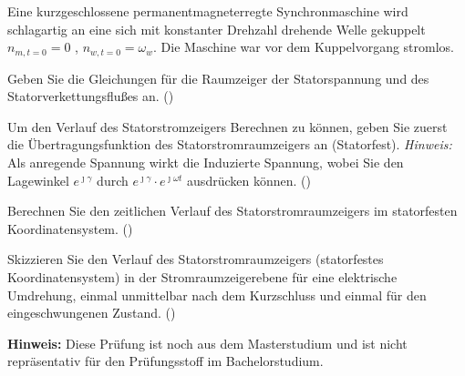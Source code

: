 \begin{question}[section=1,mode=exm,type=bsp,name={9.5.2011},tags={20110509}]
	Eine kurzgeschlossene permanentmagneterregte Synchronmaschine wird schlagartig an eine sich mit konstanter Drehzahl drehende Welle gekuppelt $n_{m,t=0}=0$ , $n_{w,t=0} = \omega_w$. Die Maschine war vor dem Kuppelvorgang stromlos.
	\begin{compactenum}
		\item Geben Sie die Gleichungen für die Raumzeiger der Statorspannung und des Statorverkettungsflußes an. ()
		\item Um den Verlauf des Statorstromzeigers Berechnen zu können, geben Sie zuerst die Übertragungsfunktion des Statorstromraumzeigers an (Statorfest). \textit{Hinweis:} Als anregende Spannung wirkt die Induzierte Spannung, wobei Sie den Lagewinkel $e^{\jmath \gamma}$ durch $e^{\jmath \gamma} \cdot e^{\jmath \omega t}$ ausdrücken können. ()
		\item Berechnen Sie den zeitlichen Verlauf des Statorstromraumzeigers im statorfesten Koordinatensystem. ()
		\item Skizzieren Sie den Verlauf des Statorstromraumzeigers (statorfestes Koordinatensystem) in der Stromraumzeigerebene für eine elektrische Umdrehung, einmal unmittelbar nach dem Kurzschluss und einmal für den eingeschwungenen Zustand. ()
	\end{compactenum}
\end{question}
\begin{solution}
	\textbf{Hinweis:} Diese Prüfung ist noch aus dem Masterstudium und ist nicht repräsentativ für den Prüfungsstoff im Bachelorstudium.
\end{solution}